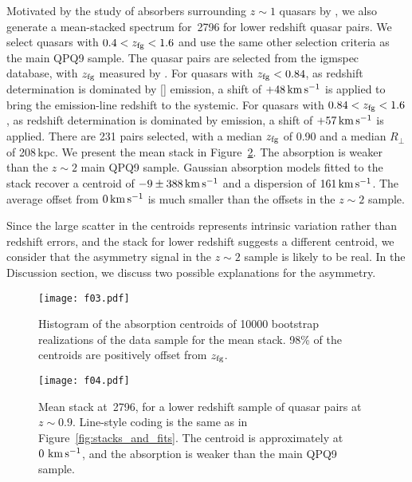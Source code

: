 \documentclass[iop]{emulateapj}
\begin{document}
Motivated by the study of  absorbers surrounding $z\sim1$ quasars by \cite{Johnson+15}, 
we also generate a mean-stacked spectrum for \,2796 for lower redshift quasar pairs.  
We select quasars with $0.4<z_{\rm fg}<1.6$ and use the same other selection criteria as the main 
QPQ9 sample. The quasar pairs are selected from the igmspec database, with $z_{\rm fg}$ measured 
by \cite{HewettWild10}. For quasars with $z_{\rm fg}<0.84$, as redshift determination is dominated 
by [] emission, a shift of $+48\,{\rm km\,s^{-1}}$ is applied to bring the emission-line 
redshift to the systemic. For quasars with $0.84<z_{\rm fg}<1.6$, as redshift determination is 
dominated by  emission, a shift of $+57\,{\rm km\,s^{-1}}$ is applied. There are 231 
pairs selected, with a median $z_{\rm fg}$ of 0.90 and a median $R_\perp$ of 208\,kpc. We present 
the mean stack in Figure~\ref{fig:stack_z1}. The absorption is weaker than the $z\sim2$ main QPQ9 
sample. Gaussian absorption models fitted to the stack recover a centroid of 
$-9\pm388\,{\rm km\,s^{-1}}$ and a dispersion of $161\,{\rm km\,s^{-1}}$. The average offset 
from $0\,{\rm km\,s^{-1}}$ is much smaller than the offsets in the $z\sim2$ sample. 

Since the large scatter in the centroids represents intrinsic variation rather than redshift 
errors, and the  stack for lower redshift suggests a different centroid, we 
consider that the asymmetry signal in the $z\sim2$ sample is likely to be real. In the Discussion 
section, we discuss two possible explanations for the asymmetry. 

\begin{figure}
\texttt{[image: f03.pdf]}
\caption{Histogram of the absorption centroids of 10000 bootstrap realizations of the data sample 
for the  mean stack. 98\% of the centroids are positively offset from $z_{\rm fg}$.}
\label{fig:histogram_cen}
\end{figure}

\begin{figure}
\texttt{[image: f04.pdf]}
\caption{Mean stack at \,2796, for a lower redshift sample of quasar pairs at 
$z\sim0.9$. Line-style coding is the same as in Figure~\ref{fig:stacks_and_fits}. The centroid is 
approximately at $0\,{\rm \,km\,s^{-1}}$, and the absorption is weaker than the main QPQ9 sample. 
}
\label{fig:stack_z1}
\end{figure}
\end{document}
